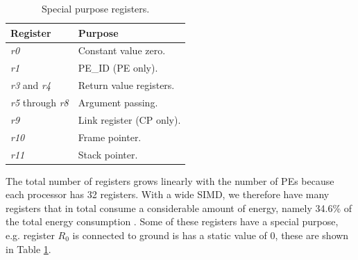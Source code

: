 \begin{table}[H]
\caption{Special purpose registers.}
\begin{center}
\begin{tabular}{@{}l l@{}}
\toprule
\textbf{Register} & \textbf{Purpose} \\ \hline
\emph{r0} & Constant value zero. \\
\emph{r1} & PE\_ID (PE only). \\
\emph{r3} and \emph{r4} & Return value registers. \\
\emph{r5} through \emph{r8} & Argument passing. \\
\emph{r9} & Link register (CP only). \\ 
\emph{r10} & Frame pointer. \\
\emph{r11} & Stack pointer. \\
\bottomrule
\end{tabular}
\end{center}
\label{table:special_registers}
\end{table}%

The total number of registers grows linearly with the number of PEs because each processor has 32 registers. With a wide SIMD, we therefore have many registers that in total consume a considerable amount of energy, namely 34.6\% of the total energy consumption \cite{dongrio1}. Some of these registers have a special purpose, e.g. register $R_0$ is connected to ground is has a static value of $0$, these are shown in Table \ref{table:special_registers}.








